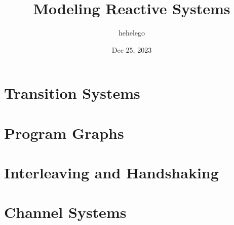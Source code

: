 \documentclass{article}
\title{Modeling Reactive Systems}
\author{hehelego}
\date{Dec 25, 2023}
\begin{document}
\maketitle

\section{Transition Systems}

\section{Program Graphs}

\section{Interleaving and Handshaking}

\section{Channel Systems}
\end{document}
